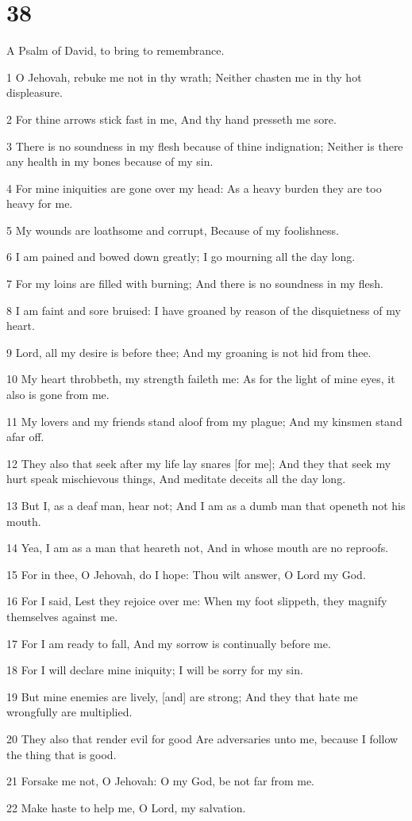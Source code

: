 \chapter{38}

\par A Psalm of David, to bring to remembrance.

\par 1 O Jehovah, rebuke me not in thy wrath; Neither chasten me in thy hot displeasure.
\par 2 For thine arrows stick fast in me, And thy hand presseth me sore.
\par 3 There is no soundness in my flesh because of thine indignation; Neither is there any health in my bones because of my sin.
\par 4 For mine iniquities are gone over my head: As a heavy burden they are too heavy for me.
\par 5 My wounds are loathsome and corrupt, Because of my foolishness.
\par 6 I am pained and bowed down greatly; I go mourning all the day long.
\par 7 For my loins are filled with burning; And there is no soundness in my flesh.
\par 8 I am faint and sore bruised: I have groaned by reason of the disquietness of my heart.
\par 9 Lord, all my desire is before thee; And my groaning is not hid from thee.
\par 10 My heart throbbeth, my strength faileth me: As for the light of mine eyes, it also is gone from me.
\par 11 My lovers and my friends stand aloof from my plague; And my kinsmen stand afar off.
\par 12 They also that seek after my life lay snares [for me]; And they that seek my hurt speak mischievous things, And meditate deceits all the day long.
\par 13 But I, as a deaf man, hear not; And I am as a dumb man that openeth not his mouth.
\par 14 Yea, I am as a man that heareth not, And in whose mouth are no reproofs.
\par 15 For in thee, O Jehovah, do I hope: Thou wilt answer, O Lord my God.
\par 16 For I said, Lest they rejoice over me: When my foot slippeth, they magnify themselves against me.
\par 17 For I am ready to fall, And my sorrow is continually before me.
\par 18 For I will declare mine iniquity; I will be sorry for my sin.
\par 19 But mine enemies are lively, [and] are strong; And they that hate me wrongfully are multiplied.
\par 20 They also that render evil for good Are adversaries unto me, because I follow the thing that is good.
\par 21 Forsake me not, O Jehovah: O my God, be not far from me.
\par 22 Make haste to help me, O Lord, my salvation.

